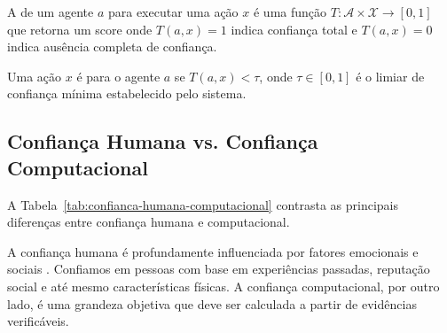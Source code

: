 \begin{definicao}
A  de um agente $a$ para executar
uma ação $x$ é uma função $T: \mathcal{A} \times \mathcal{X} \to [0,1]$
que retorna um score onde $T(a, x) = 1$ indica confiança total e
$T(a, x) = 0$ indica ausência completa de confiança.
\end{definicao}

\begin{definicao}
Uma ação $x$ é  para o agente $a$ se
$T(a, x) < \tau$, onde $\tau \in [0,1]$ é o limiar de confiança
mínima estabelecido pelo sistema.
\end{definicao}

\subsection{Confiança Humana vs. Confiança Computacional}

A Tabela~\ref{tab:confianca-humana-computacional} contrasta as
principais diferenças entre confiança humana e computacional.

\begin{table}[htb]
\centering
    \small
\caption{Confiança humana vs. computacional}
\label{tab:confianca-humana-computacional}
\end{table}

A confiança humana é profundamente influenciada por fatores emocionais
e sociais \cite{kahneman2003perspective}. Confiamos em pessoas com base
em experiências passadas, reputação social e até mesmo características
físicas. A confiança computacional, por outro lado, é uma grandeza
objetiva que deve ser calculada a partir de evidências verificáveis.

